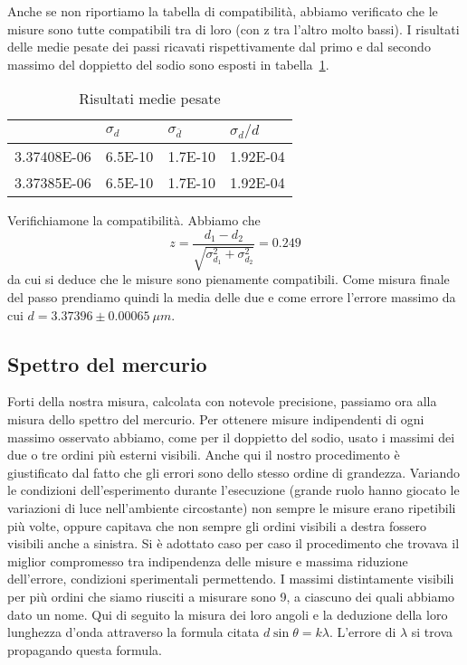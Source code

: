 \documentclass[a4paper,10pt]{article}
\begin{document}
	Anche se non riportiamo la tabella di compatibilità, abbiamo verificato che le misure sono tutte compatibili tra di loro (con z tra l'altro molto bassi). I risultati delle medie pesate dei passi ricavati rispettivamente dal primo e dal secondo massimo del doppietto del sodio sono esposti in tabella~\ref{tab3}.
	
	\begin{table}[htbp]
  \centering
  \caption{Risultati medie pesate}
  	\medskip
    \begin{tabular}{rrrr}
    \bottomrule
    \rowcolor[rgb]{ .267,  .447,  .769} \multicolumn{1}{l}{\textcolor[rgb]{ 1,  1,  1}{\textbf{$d$ (m)}}} & \multicolumn{1}{l}{\textcolor[rgb]{ 1,  1,  1}{\textbf{$\sigma _d$}}} & \multicolumn{1}{l}{\textcolor[rgb]{ 1,  1,  1}{\textbf{$\sigma _{\overline{d}}$}}} & \multicolumn{1}{l}{\textcolor[rgb]{ 1,  1,  1}{\textbf{$\sigma _d / d$}}} \\
    \toprule
    3.37408E-06 & 6.5E-10 & 1.7E-10 & 1.92E-04 \\
    3.37385E-06 & 6.5E-10 & 1.7E-10 & 1.92E-04 \\
    \toprule
    \end{tabular}%
  \label{tab3}%
\end{table}%

	Verifichiamone la compatibilità. Abbiamo che $$z = \frac{d_1 - d_2}{\sqrt{\sigma _{d_1} ^2 +\sigma _{d_2} ^2}} = 0.249$$ da cui si deduce che le misure sono pienamente compatibili. Come misura finale del passo prendiamo quindi la media delle due e come errore l'errore massimo da cui $d = 3.37396 \pm 0.00065 \ \mu m$.
	
	\subsection{Spettro del mercurio}
	Forti della nostra misura, calcolata con notevole precisione, passiamo ora alla misura dello spettro del mercurio. Per ottenere misure indipendenti di ogni massimo osservato abbiamo, come per il doppietto del sodio, usato i massimi dei due o tre ordini più esterni visibili. Anche qui il nostro procedimento è giustificato dal fatto che gli errori sono dello stesso ordine di grandezza. Variando le condizioni dell'esperimento durante l'esecuzione (grande ruolo hanno giocato le variazioni di luce nell'ambiente circostante) non sempre le misure erano ripetibili più volte, oppure capitava che non sempre gli ordini visibili a destra fossero visibili anche a sinistra. Si è adottato caso per caso il procedimento che trovava il miglior compromesso tra indipendenza delle misure e massima riduzione dell'errore, condizioni sperimentali permettendo. I massimi distintamente visibili per più ordini che siamo riusciti a misurare sono 9, a ciascuno dei quali abbiamo dato un nome. Qui di seguito la misura dei loro angoli e la deduzione della loro lunghezza d'onda attraverso la formula citata $d \sin \theta = k \lambda$. L'errore di $\lambda$ si trova propagando questa formula.
        
\end{document}
